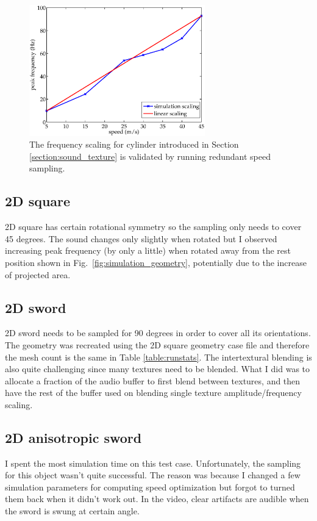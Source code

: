 \documentclass[tog]{acmsiggraph}
\begin{document}
\begin{figure}[ht]
  \centering
  \includegraphics[width=3.0in]{images/cylinder_frequency_scaling.eps}
  \caption{The frequency scaling for cylinder introduced in Section \ref{section:sound_texture} is validated by running redundant speed sampling.}
  \label{fig:frequency_scaling}
\end{figure}

\subsection{2D square} 
2D square has certain rotational symmetry so the sampling only needs to cover 45 degrees. The sound changes only slightly when rotated but I observed increasing peak frequency (by only a little) when rotated away from the rest position shown in Fig.~\ref{fig:simulation_geometry}, potentially due to the increase of projected area.

\subsection{2D sword} 
2D sword needs to be sampled for 90 degrees in order to cover all its orientations. The geometry was recreated using the 2D square geometry case file and therefore the mesh count is the same in Table \ref{table:runstats}. The intertextural blending is also quite challenging since many textures need to be blended. What I did was to allocate a fraction of the audio buffer to first blend between textures, and then have the rest of the buffer used on blending single texture amplitude/frequency scaling.

\subsection{2D anisotropic sword} 
I spent the most simulation time on this test case. Unfortunately, the sampling for this object wasn't quite successful. The reason was because I changed a few simulation parameters for computing speed optimization but forgot to turned them back when it didn't work out. In the video, clear artifacts are audible when the sword is swung at certain angle. 
\end{document}

